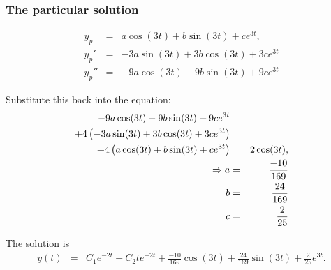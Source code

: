 \begin{frame}
  \frametitle{The particular solution}

  \begin{eqnarray*}
    y_p & = & a \cos(3t) + b \sin(3t) + ce^{3t}, \\
    y_p' & = & -3 a \sin(3t) + 3b \cos(3t) + 3 c e^{3t}\\
    y_p'' & = & -9 a \cos(3t) - 9b \sin(3t) + 9 c e^{3t}
  \end{eqnarray*}

  Substitute this back into the equation:
  \begin{eqnarray*}
    -9 a \cos(3t) - 9b \sin(3t) + 9 c e^{3t} & & \\
    + 4 \left( -3 a \sin(3t) + 3b \cos(3t) + 3c e^{3t}\right)  & & \\
    + 4 \left( a \cos(3t) + b \sin(3t) + c e^{3t}\right)
     & = & 2 \cos(3t), \\
    \Rightarrow 
    a & = & \frac{-10}{169} \\
    b & = & \frac{24}{169} \\
    c & = & \frac{2}{25} 
  \end{eqnarray*}


\end{frame}


\begin{frame}

  The solution is 
  \begin{eqnarray*}
    y(t) & = & C_1 e^{-2t} + C_2 t e^{-2t} + \frac{-10}{169}\cos(3t) +
    \frac{24}{169} \sin(3t) + \frac{2}{25}  e^{3t}.
  \end{eqnarray*}
  
\end{frame}



